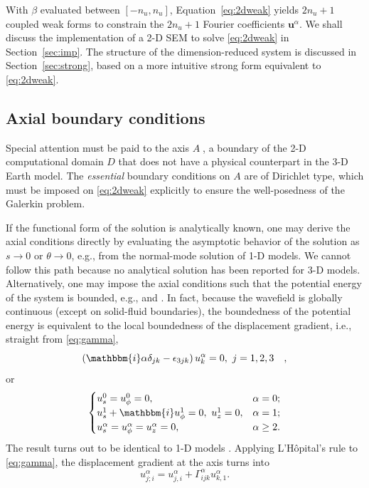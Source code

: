 \documentclass[extra]{gji}
\begin{document}
With $\beta$ evaluated between $[-n_u,n_u]$, Equation~\eqref{eq:2dweak} yields
$2n_u+1$ coupled weak forms to constrain the $2n_u+1$ Fourier coefficients 
$\mathbf{u}^\alpha$. We shall discuss the implementation of a 2-D SEM to solve
\eqref{eq:2dweak} in Section~\ref{sec:imp}. 
The structure of the dimension-reduced system is discussed in 
Section~\ref{sec:strong}, based on a more intuitive strong form
equivalent to \eqref{eq:2dweak}.   

\subsection{Axial boundary conditions}
Special attention must be paid to the axis $A$􏰁, a boundary of the 2-D 
computational domain $D$ that does not have a physical counterpart 
in the 3-D Earth model. The \textit{essential} boundary conditions on
$A$ are of Dirichlet type, which must be imposed on \eqref{eq:2dweak} 
explicitly to ensure the well-posedness of the Galerkin problem. 

If the functional form of the solution is analytically known, one may
derive the axial conditions directly by evaluating the asymptotic
behavior of the solution as $s\rightarrow0$ or $\theta\rightarrow0$, e.g., 
\cite{nissen2007axisem} from the normal-mode solution of 1-D models. 
We cannot follow this path because no analytical solution has been reported 
for 3-D models. Alternatively, one may impose the axial conditions such 
that the potential energy of the system is bounded, e.g.,
\cite{lopez1998efficient} and \cite{fournier2005fourier}. 
In fact, because the wavefield is globally continuous (except on 
solid-fluid boundaries), the boundedness of 
the potential energy is equivalent to the local boundedness of the 
displacement gradient, i.e., straight from \eqref{eq:gamma},
\begin{equation}
  \left(\mathbbm{i}\alpha\delta_{jk}-\epsilon_{3jk}\right) u_k^\alpha=0,\ j=1,2,3\quad,
  \label{eq:axbd}
\end{equation}
or 
\begin{equation}
  \begin{cases}
    u_s^0=u_\phi^0=0, & \alpha=0; \\
    u_s^1+\mathbbm{i}u_\phi^1=0,\ u_z^1=0, & \alpha=1; \\
    u_s^\alpha=u_\phi^\alpha=u_z^\alpha=0, & \alpha\ge2.
  \end{cases}
  \label{eq:mask}
\end{equation}
The result turns out to be identical to 1-D models \cite[]{nissen2007axisem}. 
Applying L'H\^opital's rule to \eqref{eq:gamma}, the displacement gradient 
at the axis turns into
\begin{equation}
  u_{j;i}^\alpha = u_{j,i}^\alpha+
  \Gamma_{ijk}^\alpha u_{k,1}^\alpha.
  \label{eq:axigrad_u}
\end{equation} 
  
\end{document}
